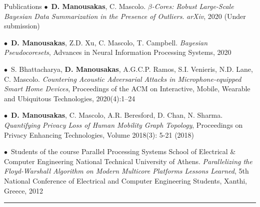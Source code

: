 \documentclass[11pt]{resume}
\begin{document}
\begin{category}{Publications}
\citemnobullet $\bullet$~\textbf{D. Manousakas}, C. Mascolo. \emph{$\beta$-Cores: Robust Large-Scale Bayesian Data Summarization in the Presence of Outliers}. \emph{arXiv}, 2020 (Under submission)

\citemnobullet $\bullet$~\textbf{D. Manousakas}, Z.D. Xu, C. Mascolo, T. Campbell. \emph{Bayesian Pseudocoresets}, Advances in Neural Information Processing Systems, 2020 

\citemnobullet $\bullet$~S. Bhattacharya, \textbf{D. Manousakas}, A.G.C.P. Ramos, S.I. Venieris, N.D. Lane, C. Mascolo. \emph{Countering Acoustic Adversarial Attacks in Microphone-equipped Smart Home Devices}, Proceedings of the ACM on Interactive, Mobile, Wearable and Ubiquitous Technologies, 2020(4):1--24

\citemnobullet $\bullet$~\textbf{D. Manousakas}, C. Mascolo, A.R. Beresford, D. Chan, N. Sharma. \emph{Quantifying Privacy Loss of Human Mobility Graph Topology}, Proceedings on Privacy Enhancing Technologies, Volume 2018(3): 5-21 (2018)

\citemnobullet $\bullet$~Students of the course Parallel Processing Systems  School of Electrical \& Computer Engineering National Technical University of Athens.
\textit{Parallelizing the Floyd-Warshall Algorithm on
	Modern Multicore Platforms
	Lessons Learned}, 5th National Conference of Electrical and Computer Engineering Students, Xanthi, Greece, 2012 

\noindent\rule{\textwidth}{0.2pt}
\end{category}
\end{document}
